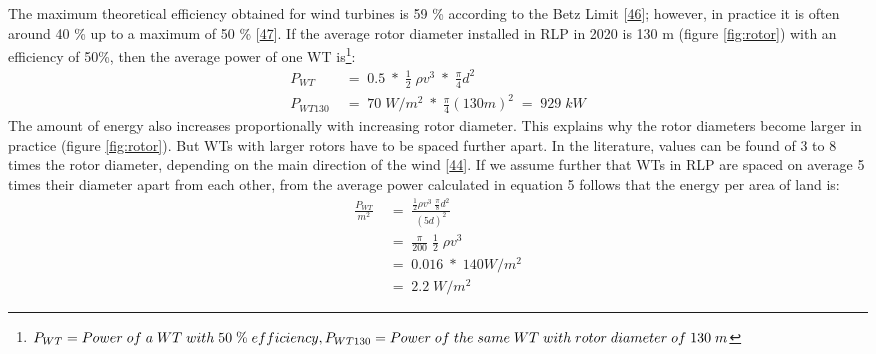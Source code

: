 \documentclass[a4paper,11pt]{article}
\begin{document}
The maximum theoretical efficiency obtained for wind turbines is 59 \% according to the Betz Limit {[}\protect\hyperlink{ref-A.Betz.1920}{46}{]}; however, in practice it is often around 40 \% up to a maximum of 50 \% {[}\protect\hyperlink{ref-WindwartsEnergieausdemNorden.2021}{47}{]}. If the average rotor diameter installed in RLP in 2020 is 130 m (figure \ref{fig:rotor}) with an efficiency of 50\%, then the average power of one WT is\footnote{\(P_{WT}=Power\; of\; a\; WT\; with\; 50\; \%\; efficiency,\;\\ P_{WT130}=Power\; of\; the\; same\; WT\; with\; rotor\; diameter\; of\; 130\; m\)}:
\begin{equation}
\begin{split}
P_{WT}\; & =\; 0.5\; *\; \frac{1}{2}\; \rho v^3\; *\; \frac{\pi}{4}d^2 \\
P_{WT130}\; & =\; 70\; W/m^2\; *\; \frac{\pi}{4}(130 m)^2\; =\; 929\; kW
\end{split}
\end{equation}
The amount of energy also increases proportionally with increasing rotor diameter. This explains why the rotor diameters become larger in practice (figure \ref{fig:rotor}). But WTs with larger rotors have to be spaced further apart. In the literature, values can be found of 3 to 8 times the rotor diameter, depending on the main direction of the wind {[}\protect\hyperlink{ref-DavidJCMacKay.2009}{44}{]}. If we assume further that WTs in RLP are spaced on average 5 times their diameter apart from each other, from the average power calculated in equation 5 follows that the energy per area of land is:
\begin{equation}
\begin{split}
\frac{P_{WT}}{m^2}\; & =\; \frac{\frac{1}{2} \rho v^3\; \frac{\pi}{8}d^2}{(5d)^2} \\
 & =\; \frac{\pi}{200}\; \frac{1}{2}\; \rho v^3 \\
 & =\; 0.016\; *\; 140 W/m^2 \\
 & =\; 2.2\; W/m^2
\end{split}
\end{equation}
\end{document}

